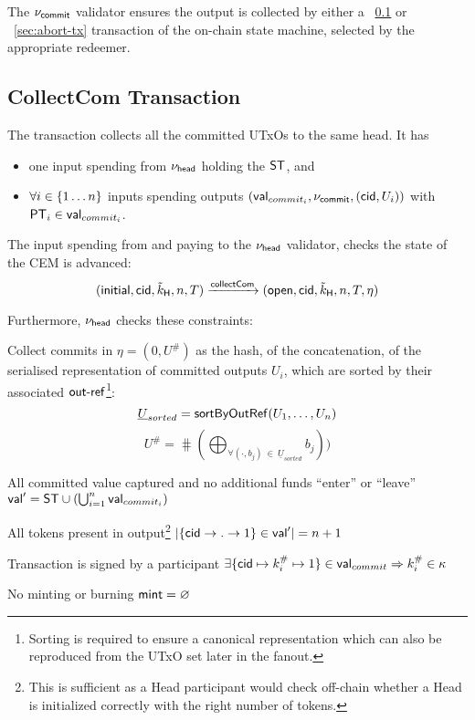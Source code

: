\noindent The $\nu_\mathsf{commit}$ validator ensures the output is collected by either a \mtxCCom{}~\ref{sec:collect-tx} or \mtxAbort{}~\ref{sec:abort-tx} transaction of the on-chain state machine, selected by the appropriate redeemer.

\subsection{CollectCom Transaction}\label{sec:collect-tx}



\noindent The \mtxCCom{} transaction collects all the committed UTxOs to the same head. It has
\begin{itemize}
  \item one input spending from $\nu_\mathsf{head}$ holding the $\mathsf{ST}$, and
  \item $\forall i \in \{1 \dots n\}$ inputs spending \mtxCom{} outputs $(\mathsf{val}_{commit_i}, \nu_\mathsf{commit}, (\mathsf{cid}, U_{i}))$ with $\mathsf{PT}_{i} \in \mathsf{val}_{commit_{i}}$.
\end{itemize}
The input spending from and paying to the $\nu_\mathsf{head}$ validator, checks the state
of the CEM is advanced:
\[
   (\mathsf{initial},\mathsf{cid},\tilde{k}_{\mathsf{H}},n,T) \xrightarrow{\mathsf{collectCom}} (\mathsf{open},\mathsf{cid},\tilde{k}_{\mathsf{H}},n,T,\eta)
\]

\noindent Furthermore, $\nu_\mathsf{head}$ checks these constraints:
\begin{menumerate}
  \item Collect commits in $\eta = (0, U^{\#})$ as the hash, of the concatenation, of
  the serialised representation of committed outputs $U_{i}$, which are sorted by their associated $\mathsf{out\textsf{-}{}ref}$\footnote{Sorting is required to ensure a canonical representation which can also be reproduced from the UTxO set later in the fanout.}:  
  \[
    \underline{U}_{sorted} = \mathsf{sortByOutRef} ( U_{1}, \dots, U_{n} )
  \]
  \[
    U^{\#} = \hash(\bigoplus_{\forall (\cdot, b_{j})~\in~\underline{U}_{sorted}} b_{j}))
  \]
  \item All committed value captured and no additional funds ``enter'' or ``leave''\\
  $\mathsf{val}' = \mathsf{ST} \cup (\bigcup_{i=1}^{n} \mathsf{val}_{commit_i})$
  \item All tokens present in output\footnote{This is sufficient as a Head participant would check off-chain whether a Head is initialized correctly with the right number of tokens.}
  $|\{\mathsf{cid} \rightarrow . \rightarrow 1\} \in \mathsf{val}'| = n + 1$
  \item Transaction is signed by a participant $\exists \{\mathsf{cid} \mapsto k^{\#}_{i} \mapsto 1\} \in \mathsf{val}_{commit} \Rightarrow k^{\#}_{i} \in \kappa$
  \item No minting or burning  $\mathsf{mint} = \varnothing$
\end{menumerate}

